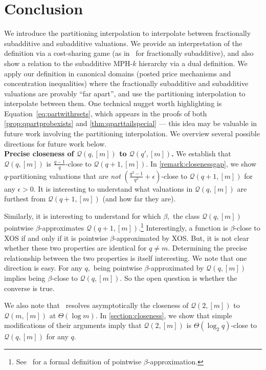 \documentclass[11pt]{article}%
\numberwithin{theorem}{subsection}
\begin{document}
\section{Conclusion}
\label{section:futurework}
We introduce the partitioning interpolation to interpolate between fractionally subadditive and subadditive valuations. We provide an interpretation of the definition via a cost-sharing game (as in~\cite{Bondareva63,Shapley67} for fractionally subadditive), and also show a relation to the subadditive MPH-$k$ hierarchy via a dual definition. We apply our definition in canonical domains (posted price mechanisms and concentration inequalities) where the fractionally subadditive and subadditive valuations are provably ``far apart'', and use the partitioning interpolation to interpolate between them. One technical nugget worth highlighting is Equation~\eqref{eq:partwithrsets}, which appears in the proofs of both \cref{prop:qpartprobexists} and \cref{thm:qparttailspecial} --- this idea may be valuable in future work involving the partitioning interpolation. We overview several possible directions for future work below.\\

\noindent\textbf{Precise closeness of $\mathcal{Q}(q,[m])$ to $\mathcal{Q}(q',[m])$.} We establish that $\mathcal{Q}(q,[m])$ is $\frac{q-1}{q}$-close to $\mathcal{Q}(q+1,[m])$. In \cref{remark:closenessgap}, we show $q$-partitioning valuations that are \emph{not} $\left(\frac{q^2-1}{q^2}+\epsilon\right)$-close to $\mathcal{Q}(q+1,[m])$ for any $\epsilon>0.$ It is interesting to understand what valuations in $\mathcal{Q}(q,[m])$ are furthest from $\mathcal{Q}(q+1,[m])$ (and how far they are). 

Similarly, it is interesting to understand for which $\beta,$ the class $\mathcal{Q}(q,[m])$ pointwise $\beta$-approximates $\mathcal{Q}(q+1,[m])$.\footnote{See~\cite{DevanurMSW15} for a formal definition of pointwise $\beta$-approximation.} Interestingly, a function is $\beta$-close to XOS if and only if it is pointwise $\beta$-approximated by XOS. But, it is not clear whether these two properties are identical for $q\neq m.$ Determining the precise relationship between the two properties is itself interesting. We note that one direction is easy. For any $q,$ being pointwise $\beta$-approximated by $\mathcal{Q}(q,[m])$ implies being $\beta$-close to $\mathcal{Q}(q,[m])$. So the open question is whether the converse is true.

We also note that~\cite{BhawalkarR11} resolves asymptotically the closeness of $\mathcal{Q}(2,[m])$ to $\mathcal{Q}(m,[m])$ at $\Theta(\log m)$. In \cref{section:closeness}, we show that simple modifications of their arguments imply that $\mathcal{Q}(2,[m])$ is $\Theta(\log_2 q)$-close to $\mathcal{Q}(q,[m])$ for any $q$.\\
\end{document}
